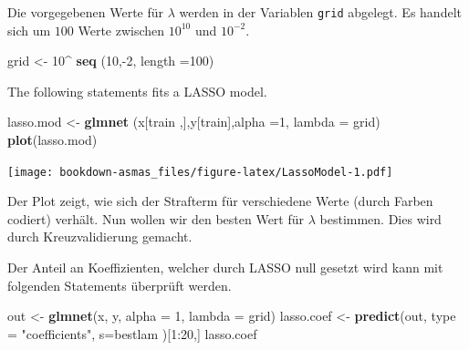 \documentclass[]{book}
\newenvironment{Shaded}{\begin{snugshade}}{\end{snugshade}}
\newcommand{\KeywordTok}[1]{\textcolor[rgb]{0.13,0.29,0.53}{\textbf{{#1}}}}
\newcommand{\DataTypeTok}[1]{\textcolor[rgb]{0.13,0.29,0.53}{{#1}}}
\newcommand{\DecValTok}[1]{\textcolor[rgb]{0.00,0.00,0.81}{{#1}}}
\newcommand{\StringTok}[1]{\textcolor[rgb]{0.31,0.60,0.02}{{#1}}}
\newcommand{\NormalTok}[1]{{#1}}
\begin{document}
Die vorgegebenen Werte für \(\lambda\) werden in der Variablen
\texttt{grid} abgelegt. Es handelt sich um \(100\) Werte zwischen
\(10^10\) und \(10^{-2}\).

\begin{Shaded}
\begin{Highlighting}[]
\NormalTok{grid <-}\StringTok{ }\DecValTok{10}\NormalTok{^}\StringTok{ }\KeywordTok{seq} \NormalTok{(}\DecValTok{10}\NormalTok{,-}\DecValTok{2}\NormalTok{, }\DataTypeTok{length =}\DecValTok{100}\NormalTok{)}
\end{Highlighting}
\end{Shaded}

The following statements fits a LASSO model.

\begin{Shaded}
\begin{Highlighting}[]
\NormalTok{lasso.mod <-}\StringTok{ }\KeywordTok{glmnet} \NormalTok{(x[train ,],y[train],}\DataTypeTok{alpha =}\DecValTok{1}\NormalTok{, }\DataTypeTok{lambda =} \NormalTok{grid)}
\KeywordTok{plot}\NormalTok{(lasso.mod)}
\end{Highlighting}
\end{Shaded}

\texttt{[image: bookdown-asmas\_files/figure-latex/LassoModel-1.pdf]}

Der Plot zeigt, wie sich der Strafterm für verschiedene Werte (durch
Farben codiert) verhält. Nun wollen wir den besten Wert für \(\lambda\)
bestimmen. Dies wird durch Kreuzvalidierung gemacht.

\begin{Shaded}
\end{Shaded}

Der Anteil an Koeffizienten, welcher durch LASSO null gesetzt wird kann
mit folgenden Statements überprüft werden.

\begin{Shaded}
\begin{Highlighting}[]
\NormalTok{out <-}\StringTok{ }\KeywordTok{glmnet}\NormalTok{(x, y, }\DataTypeTok{alpha =} \DecValTok{1}\NormalTok{, }\DataTypeTok{lambda =} \NormalTok{grid)}
\NormalTok{lasso.coef <-}\StringTok{ }\KeywordTok{predict}\NormalTok{(out, }\DataTypeTok{type =} \StringTok{"coefficients"}\NormalTok{, }\DataTypeTok{s=}\NormalTok{bestlam )[}\DecValTok{1}\NormalTok{:}\DecValTok{20}\NormalTok{,]}
\NormalTok{lasso.coef}
\end{Highlighting}
\end{Shaded}
\end{document}
